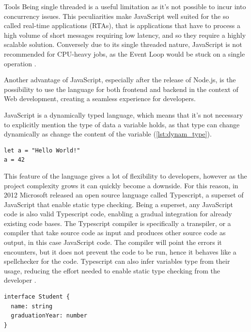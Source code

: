 \begin{chapter}{Tools}
    Being single threaded is a useful limitation as it's not possible to incur
    into concurrency issues.
    This peculiarities make JavaScript well suited for the so called real-time
    applications (RTAs), that is applications that have to process a high volume
    of short messages requiring low latency, and so they require a highly scalable
    solution. Conversely due to its single threaded nature, JavaScript is not
    recommended for CPU-heavy jobs, as the Event Loop would be stuck on a single
    operation \cite{node_event_loop}\cite{node_on_backend}.

    Another advantage of JavaScript, especially after the release of Node.js, is
    the possibility to use the language for both frontend and backend in the context
    of Web development, creating a seamless experience for developers.

    JavaScript is a dynamically typed language, which means that it's not necessary
    to explicitly mention the type of data a variable holds, as that type can change
    dynamically as change the content of the variable (\ref{lst:dynam_type}).

    \bigskip
    \begin{lstlisting}[caption=Dynamically typed variables, label={lst:dynam_type}]
let a = "Hello World!"
a = 42
    \end{lstlisting}

    This feature of the language gives a lot of flexibility to developers, however
    as the project complexity grows it can quickly become a downside.
    For this reason, in 2012 Microsoft released an open source language called
    Typescript, a superset of JavaScript that enable static type checking.
    Being a superset, any JavaScript code is also valid Typescript code, enabling
    a gradual integration for already existing code bases.
    The Typescript compiler is specifically a transpiler, or a compiler that take
    source code as input and produces other source code as output, in this case
    JavaScript code. The compiler will point the errors it encounters, but it does
    not prevent the code to be run, hence it behaves like a spellchecker for the code.
    Typescript can also infer variables type from their usage, reducing the effort
    needed to enable static type checking from the developer
    \cite{typescript_lang}\cite{typescript}.

    \bigskip
    \begin{lstlisting}[caption=Static type checking on Typescript, label={ts_static}]
interface Student {
  name: string
  graduationYear: number
}


\end{lstlisting}
\end{chapter}
